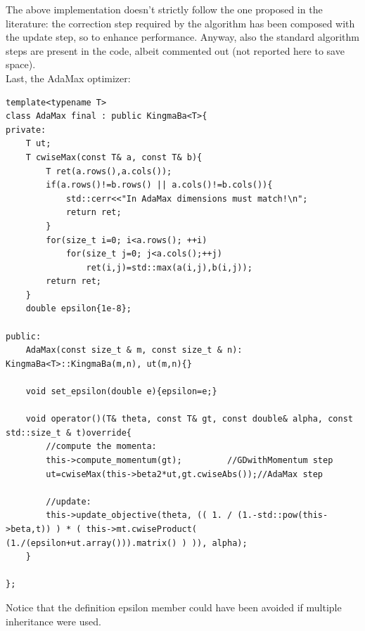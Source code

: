 \documentclass[12pt, a4paper]{report}
\theoremstyle{definition}
\begin{document}
The above implementation doesn't strictly follow the one proposed in the literature: the correction step required by the algorithm has been composed with the update step, so to enhance performance. Anyway, also the standard algorithm steps are present in the code, albeit commented out (not reported here to save space).\\
\newline\noindent Last, the AdaMax optimizer:
\begin{lstlisting}[frame=single, showstringspaces=false]
template<typename T>
class AdaMax final : public KingmaBa<T>{
private:
	T ut;
	T cwiseMax(const T& a, const T& b){
		T ret(a.rows(),a.cols());
		if(a.rows()!=b.rows() || a.cols()!=b.cols()){
			std::cerr<<"In AdaMax dimensions must match!\n";
			return ret;
		}
		for(size_t i=0; i<a.rows(); ++i)
			for(size_t j=0; j<a.cols();++j)
				ret(i,j)=std::max(a(i,j),b(i,j));
		return ret;
	}
	double epsilon{1e-8};
	
public:
	AdaMax(const size_t & m, const size_t & n): KingmaBa<T>::KingmaBa(m,n), ut(m,n){}

	void set_epsilon(double e){epsilon=e;}
	
	void operator()(T& theta, const T& gt, const double& alpha, const std::size_t & t)override{
		//compute the momenta:
		this->compute_momentum(gt);		  	//GDwithMomentum step
		ut=cwiseMax(this->beta2*ut,gt.cwiseAbs());//AdaMax step
	
		//update:
		this->update_objective(theta, (( 1. / (1.-std::pow(this->beta,t)) ) * ( this->mt.cwiseProduct( (1./(epsilon+ut.array())).matrix() ) )), alpha);
	}

};
\end{lstlisting}
Notice that the definition epsilon member could have been avoided if multiple inheritance were used.
\newpage
\end{document}
